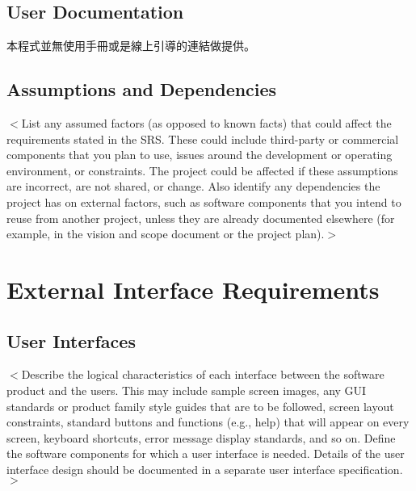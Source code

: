\documentclass{scrreprt}
\begin{document}
\section{User Documentation}
\begin{CJK}{UTF8}{<font>}
本程式並無使用手冊或是線上引導的連結做提供。
\end{CJK}

\section{Assumptions and Dependencies}
\begin{CJK}{UTF8}{<font>}
$<$List any assumed factors (as opposed to known facts) that could affect the 
requirements stated in the SRS. These could include third-party or commercial 
components that you plan to use, issues around the development or operating 
environment, or constraints. The project could be affected if these assumptions 
are incorrect, are not shared, or change. Also identify any dependencies the 
project has on external factors, such as software components that you intend to 
reuse from another project, unless they are already documented elsewhere (for 
example, in the vision and scope document or the project plan).$>$
\end{CJK}

\chapter{External Interface Requirements}

\section{User Interfaces}
\begin{CJK}{UTF8}{<font>}
$<$Describe the logical characteristics of each interface between the software 
product and the users. This may include sample screen images, any GUI standards 
or product family style guides that are to be followed, screen layout 
constraints, standard buttons and functions (e.g., help) that will appear on 
every screen, keyboard shortcuts, error message display standards, and so on.  
Define the software components for which a user interface is needed. Details of 
the user interface design should be documented in a separate user interface 
specification.$>$
\end{CJK}
\end{document}
